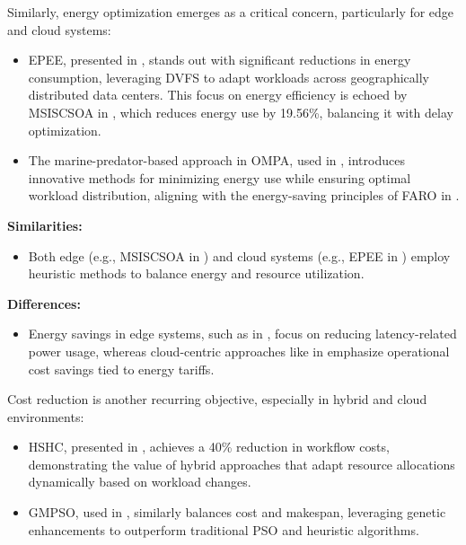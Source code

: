 \documentclass[a4paper, final]{article}
\begin{document}
Similarly, energy optimization emerges as a critical concern, particularly for edge and cloud systems:
\begin{itemize}
    \item EPEE, presented in \cite{bib:5_epee}, stands out with significant reductions in energy consumption, 
    leveraging DVFS to adapt workloads across geographically distributed data centers. This focus on 
    energy efficiency is echoed by MSISCSOA in \cite{bib:3_sandcat}, which reduces energy use by 19.56\%, balancing it with 
    delay optimization.

    \item The marine-predator-based approach in OMPA, used in \cite{bib:6_marine}, introduces innovative 
    methods for minimizing energy use while ensuring optimal workload distribution, aligning with the 
    energy-saving principles of FARO in \cite{bib:2_faro}.
\end{itemize}

\noindent \textbf{Similarities:}
\begin{itemize}
    \item Both edge (e.g., MSISCSOA in \cite{bib:3_sandcat}) and cloud systems (e.g., EPEE in 
    \cite{bib:5_epee}) employ heuristic methods to balance energy and resource utilization.
\end{itemize}

\noindent \textbf{Differences:}
\begin{itemize}
    \item Energy savings in edge systems, such as in \cite{bib:3_sandcat}, focus on reducing latency-related 
    power usage, whereas cloud-centric approaches like in \cite{bib:5_epee} emphasize operational cost 
    savings tied to energy tariffs.
\end{itemize}

Cost reduction is another recurring objective, especially in hybrid and cloud environments:
\begin{itemize}
    \item HSHC, presented in \cite{bib:9}, achieves a 40\% reduction in workflow costs, demonstrating the 
    value of hybrid approaches that adapt resource allocations dynamically based on workload changes.

    \item GMPSO, used in \cite{bib:10}, similarly balances cost and makespan, leveraging genetic enhancements 
    to outperform traditional PSO and heuristic algorithms.
\end{itemize}
\end{document}
